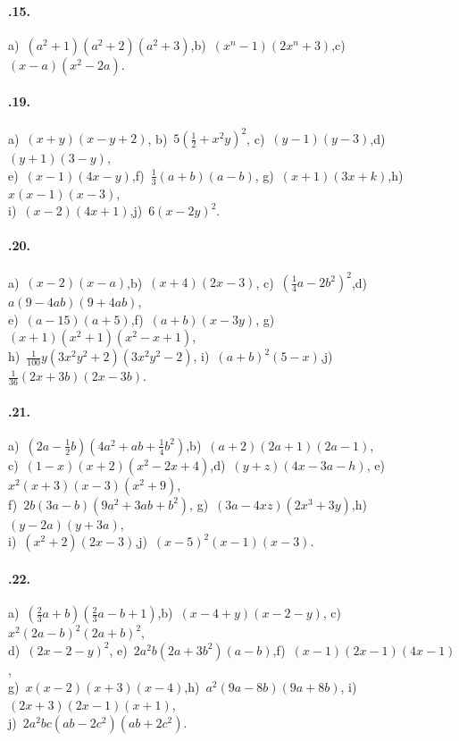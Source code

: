 \paragraph{\thechapter.15.} a)~$(a^{2}+1)(a^{2}+2)(a^{2}+3)$,\quad b)~$(x^{n}-1)(2x^{n}+3)$,\quad c)~$(x-a)\left(x^{2}-2a\right)$.

\paragraph{\thechapter.19.} a)~$(x+y)\left(x-y+2\right)$,\quad
b)~$5\left(\frac{1}{2}+x^{2}y\right)^{2}$,\quad
c)~$(y-1)\left(y-3\right)$,\quad d)~$(y+1)\left(3-y\right)$,\protect\\
e)~$(x-1)\left(4x-y\right)$,\quad f)~$\frac{1}{3}(a+b)\left(a-b\right)$,\quad
g)~$(x+1)\left(3x+k\right)$,\quad h)~$x(x-1)\left(x-3\right)$,\protect\\
i)~$(x-2)\left(4x+1\right)$,\quad j)~$6\left(x-2y\right)^{2}$.

\paragraph{\thechapter.20.} a)~$(x-2)\left(x-a\right)$,\quad b)~$(x+4)\left(2x-3\right)$,\quad
c)~$\left(\frac{1}{4}a-2b^{2}\right)^{2}$,\quad d)~$a(9-4{ab})(9+4{ab})$,\quad \protect\\
e)~$(a-15)(a+5)$,\quad f)~$(a+b)(x-3y)$,\quad
g)~$(x+1)\left(x^{2}+1\right)\left(x^{2}-x+1\right)$,\protect\\
h)~$\frac{1}{100}y\left(3x^{2}y^{2}+2\right)\left(3x^{2}y^{2}-2\right)$,\quad
i)~$(a+b)^{2}\left(5-x\right)$,\quad j)~$\frac{1}{36}(2x+3b)\left(2x-3b\right)$.

\paragraph{\thechapter.21.} a)~$\left(2a-\frac{1}{2}b\right)\left(4a^{2}+{ab}+\frac{1}{4}b^{2}\right)$,\quad b)~$(a+2)\left(2a+1\right)\left(2a-1\right)$,\quad \protect\\
c)~$(1-x)\left(x+2\right)\left(x^{2}-2x+4\right)$,\quad d)~$(y+z)(4x-3a-h)$,\quad
e)~$x^{2}(x+3)(x-3)\left(x^{2}+9\right)$,\protect\\
f)~$2b(3a-b)\left(9a^{2}+3{ab}+b^{2}\right)$,\quad
g)~$(3a-4{xz})\left(2x^{3}+3y\right)$,\quad h)~$(y-2a)\left(y+3a\right)$,\quad \protect\\
i)~$\left(x^{2}+2\right)(2x-3)$,\quad j)~$(x-5)^{2}(x-1)(x-3)$.

\paragraph{\thechapter.22.} a)~$\left(\frac{2}{3}a+b\right)\left(\frac{2}{3}a-b+1\right)$,\quad b)~$(x-4+y)(x-2-y)$,\quad
c)~$x^{2}(2a-b)^{2}(2a+b)^{2}$,\protect\\
d)~$(2x-2-y)^{2}$,\quad
e)~$2a^{2}b(2a+3b^{2})(a-b)$,\quad f)~$(x-1)(2x-1)(4x-1)$,\quad \protect\\
g)~$x(x-2)(x+3)(x-4)$,\quad h)~$a^{2}(9a-8b)(9a+8b)$,\quad
i)~$(2x+3)(2x-1)(x+1)$,\protect\\
j)~$2a^{2}{bc}({ab}-2c^{2})({ab}+2c^{2})$.

